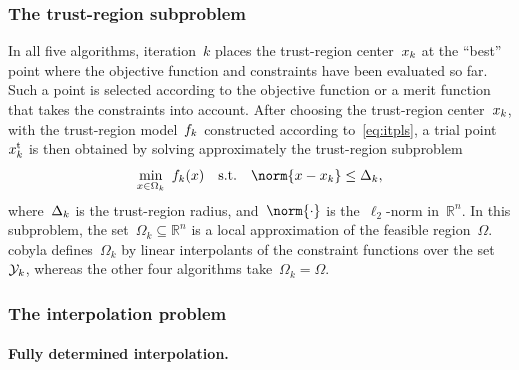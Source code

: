 \documentclass{article}
\numberwithin{equation}{section}
\theoremstyle{definition}
\theoremstyle{plain}
\theoremstyle{remark}
\newcommand*{\R}{\mathbb{R}}
\newcommand{\st}{\text{s.t.}}
\newcommand{\trust}{{\text{t}}}
\newcommand{\fsetm}[1][k]{\Omega_{#1}}
\newcommand{\fset}{\Omega}
\newcommand{\iter}[1][k]{x\ifthenelse{\equal{#1}{}}{}{_{#1}}}
\newcommand{\objm}[1][k]{\obj\ifthenelse{\equal{#1}{}}{}{_{#1}}}
\newcommand{\obj}{f}
\newcommand{\rad}[1][k]{\Delta\ifthenelse{\equal{#1}{}}{}{_{#1}}}
\newcommand{\xpt}[1][k]{\mathcal{Y}\ifthenelse{\equal{#1}{}}{}{_{#1}}}
\begin{document}
\subsubsection{The trust-region subproblem}

In all five algorithms, iteration~$k$ places the trust-region center~$\iter$ at the ``best'' point where the objective function and constraints have been evaluated so far.
Such a point is selected according to the objective function or a merit function that takes the constraints into account.
After choosing the trust-region center~$\iter$, with the trust-region model~$\objm$ constructed according to~\eqref{eq:itpls}, a trial point~$\iter^{\trust}$ is then obtained by solving approximately the trust-region subproblem
\begin{equation}
    \label{eq:trsp}
        \min_{x \in \fsetm} ~ \objm(x) \quad \st \quad \norm{x - \iter} \le \rad,
\end{equation}
where~$\rad$ is the trust-region radius, and~$\norm{\cdot}$ is the~$\ell_2$-norm in~$\R^n$.
In this subproblem, the set~$\fsetm \subseteq \R^n$ is a local approximation of the feasible region~$\fset$.
\Gls{cobyla} defines~$\fsetm$ by linear interpolants of the constraint functions over the set~$\xpt$, whereas the other four algorithms take~$\fsetm = \fset$.

\subsubsection{The interpolation problem}
\label{ssec:iptprob}

\paragraph{Fully determined interpolation.}
\end{document}
